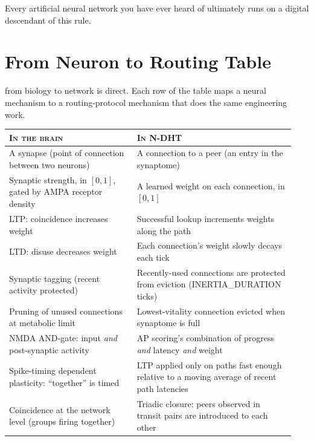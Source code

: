 \documentclass[twoside,nobib]{tufte-book}
\begin{document}
Every artificial neural network you have ever heard
of
ultimately runs on a digital descendant of this rule.

\section{From Neuron to Routing Table}

 from biology to network is direct.
Each row of the table maps a neural mechanism to a routing-protocol
mechanism that does the same engineering work.

\begin{table}[h]
\small
\begin{tabular}{@{}p{0.42\linewidth}p{0.52\linewidth}@{}}
\toprule
\textsc{In the brain} & \textsc{In N-DHT} \\
\midrule
A synapse (point of connection between two neurons) &
A connection to a peer (an entry in the synaptome) \\

Synaptic strength, in $[0, 1]$, gated by AMPA receptor density &
A learned weight on each connection, in $[0, 1]$ \\

LTP: coincidence increases weight &
Successful lookup increments weights along the path \\

LTD: disuse decreases weight &
Each connection's weight slowly decays each tick \\

Synaptic tagging (recent activity protected) &
Recently-used connections are protected from eviction
(\textsc{INERTIA\_DURATION} ticks) \\

Pruning of unused connections at metabolic limit &
Lowest-vitality connection evicted when synaptome is full \\

NMDA AND-gate: input \emph{and} post-synaptic activity &
AP scoring's combination of progress \emph{and} latency \emph{and}
weight \\

Spike-timing dependent plasticity: ``together'' is timed &
LTP applied only on paths fast enough relative to a moving
average of recent path latencies \\

Coincidence at the network level (groups firing together) &
Triadic closure: peers observed in transit pairs are introduced
to each other \\
\bottomrule
\end{tabular}
\end{table}
\end{document}
